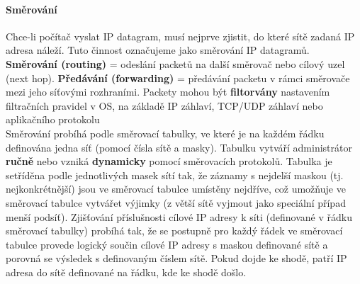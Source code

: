 \documentclass[10pt,a4paper]{article}
\begin{document}
\paragraph{Směrování} Chce-li počítač vyslat IP datagram, musí nejprve zjistit, do které sítě zadaná IP adresa náleží. Tuto činnost označujeme jako směrování IP datagramů. \textbf{Směrování (routing)} = odeslání packetů na další směrovač nebo cílový uzel (next hop). \textbf{Předávání (forwarding)} = předávání packetu v rámci směrovače mezi jeho síťovými rozhraními. Packety mohou být \textbf{filtorvány} nastavením filtračních pravidel v OS, na základě IP záhlaví, TCP/UDP záhlaví nebo aplikačního protokolu\\
Směrování probíhá podle směrovací tabulky, ve které je na každém řádku definována jedna síť (pomocí čísla sítě a masky). Tabulku vytváří administrátor \textbf{ručně} nebo vzniká \textbf{dynamicky} pomocí směrovacích protokolů. Tabulka je setříděna podle jednotlivých masek sítí tak, že záznamy s nejdelší maskou (tj. nejkonkrétnější) jsou ve směrovací tabulce umístěny nejdříve, což umožňuje ve směrovací tabulce vytvářet výjimky (z větší sítě vyjmout jako speciální případ menší podsíť).
Zjišťování příslušnosti cílové IP adresy k síti (definované v řádku směrovací tabulky) probíhá tak, že se postupně pro každý řádek ve směrovací tabulce provede logický součin cílové IP adresy s maskou definované sítě a porovná se výsledek s definovaným číslem sítě. Pokud dojde ke shodě, patří IP adresa do sítě definované na řádku, kde ke shodě došlo. \\
\end{document}

